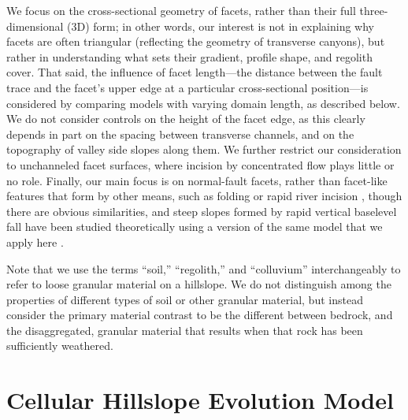 We focus on the cross-sectional geometry of facets, rather than their full three-dimensional (3D) form; in other words, our interest is not in explaining why facets are often triangular (reflecting the geometry of transverse canyons), but rather in understanding what sets their gradient, profile shape, and regolith cover. That said, the influence of facet length---the distance between the fault trace and the facet's upper edge at a particular cross-sectional position---is considered by comparing models with varying domain length, as described below. We do not consider controls on the height of the facet edge, as this clearly depends in part on the spacing between transverse channels, and on the topography of valley side slopes along them. We further restrict our consideration to unchanneled facet surfaces, where incision by concentrated flow plays little or no role. Finally, our main focus is on normal-fault facets, rather than facet-like features that  form by other means, such as folding or rapid river incision \citep[e.g.,][]{cotton1950tectonic}, though there are obvious similarities, and steep slopes formed by rapid vertical baselevel fall have been studied theoretically using a version of the same model that we apply here \citep{tucker2018lattice}.

Note that we use the terms ``soil,'' ``regolith,'' and ``colluvium'' interchangeably to refer to loose granular material on a hillslope. We do not distinguish among the properties of different types of soil or other granular material, but instead consider the primary material contrast to be the different between bedrock, and the disaggregated, granular material that results when that rock has been sufficiently weathered.


\section{Cellular Hillslope Evolution Model}

